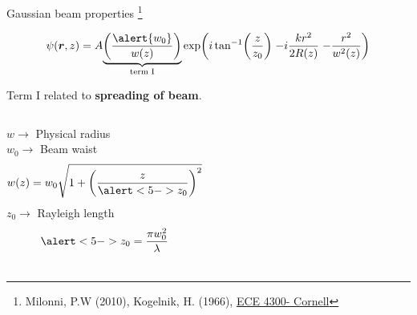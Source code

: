 \documentclass[12pt, dvipsnames]{beamer}
\numberwithin{equation}{section}
\newcommand\blfootnote[1]{%
	\begingroup
	\renewcommand\thefootnote{}\footnote{#1}%
	\addtocounter{footnote}{-1}%
	\endgroup
}
\begin{document}
\begin{frame}[t]{Gaussian beam properties}\blfootnote{Milonni, P.W (2010), Kogelnik, H. (1966), \href{https://www.youtube.com/playlist?list=PLyWzPf87clvEb8T3Xf30tMaUqdbVchrNY}{ECE 4300- Cornell}}%
	\vspace{-16pt} 
	$$\psi(\boldsymbol{r},z)=A
	{\underbrace{\left(\frac{\alert{w_0}}{w(z)}\right)}_{\text{term I}}}
	\exp(
	{i\tan[-1](\frac{z}{z_0})}\;
	{-i\frac{kr^2}{2R(z)}}\;
	{-\frac{r^2}{w^2(z)}}
	)$$
{Term I related to \textbf{spreading of beam}.\\\vspace{5pt}\pause
	\begin{columns}
	$w\rightarrow$ Physical radius\\\pause
	{\color{red}$w_0\rightarrow$ Beam waist}\pause
	$$w(z)= w_0\sqrt{1+\left(\frac{z}{\alert<5->{z_0}}\right)^2}$$\pause
	\alert<5->{$z_0\rightarrow$ Rayleigh length}
	$$ \alert<5->{z_0} = \frac{\pi w_0^2}{\lambda}$$ 
	
	
\end{columns}}

\end{frame}
\end{document}

